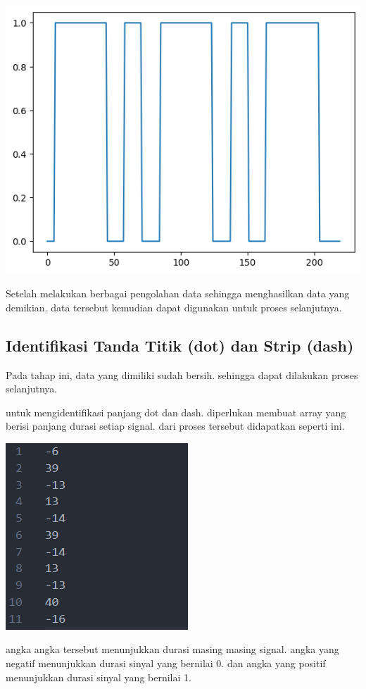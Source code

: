 \documentclass[]{article}
\begin{document}
\begin{center}
	\includegraphics[width=0.7\linewidth]{img/screenshot006}
\end{center}
Setelah melakukan berbagai pengolahan data sehingga menghasilkan data yang demikian. data tersebut kemudian dapat digunakan untuk proses selanjutnya.

\subsection{Identifikasi Tanda Titik (dot) dan Strip (dash)}
Pada tahap ini, data yang dimiliki sudah bersih. sehingga dapat dilakukan proses selanjutnya. 

untuk mengidentifikasi panjang dot dan dash. diperlukan membuat array yang berisi panjang durasi setiap signal. dari proses tersebut didapatkan seperti ini.
\begin{center}
	\includegraphics[width=0.7\linewidth]{img/screenshot007}
\end{center}
angka angka tersebut menunjukkan durasi masing masing signal. angka yang negatif menunjukkan durasi sinyal yang bernilai 0. dan angka yang positif menunjukkan durasi sinyal yang bernilai 1.
\end{document}
